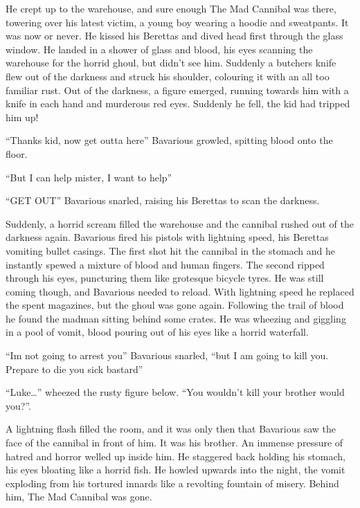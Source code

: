 He crept up to the warehouse, and sure enough The Mad Cannibal was
there, towering over his latest victim, a young boy wearing a
hoodie and sweatpants. It was now or never. He kissed his Berettas
and dived head first through the glass window. He landed in a
shower of glass and blood, his eyes scanning the warehouse for the
horrid ghoul, but didn't see him. Suddenly a butchers knife
flew out of the darkness and struck his shoulder, colouring it with
an all too familiar rust. Out of the darkness, a figure emerged,
running towards him with a knife in each hand and murderous red
eyes. Suddenly he fell, the kid had tripped him up!



``Thanks kid, now get outta here'' Bavarious growled,
spitting blood onto the floor.

``But I can help mister, I want to help''

``GET OUT'' Bavarious snarled, raising his Berettas to
scan the darkness.



Suddenly, a horrid scream filled the warehouse and the cannibal
rushed out of the darkness again. Bavarious fired his pistols with
lightning speed, his Berettas vomiting bullet casings. The first
shot hit the cannibal in the stomach and he instantly spewed a
mixture of blood and human fingers. The second ripped through his
eyes, puncturing them like grotesque bicycle tyres. He was still
coming though, and Bavarious needed to reload. With lightning speed
he replaced the spent magazines, but the ghoul was gone again.
Following the trail of blood he found the madman sitting behind
some crates. He was wheezing and giggling in a pool of vomit, blood
pouring out of his eyes like a horrid waterfall.



``Im not going to arrest you'' Bavarious snarled,
``but I am going to kill you. Prepare to die you sick
bastard''



``Luke{\ldots}'' wheezed the rusty figure below.
``You wouldn't kill your brother would
you?''.



A lightning flash filled the room, and it was only then that
Bavarious saw the face of the cannibal in front of him. It was his
brother. An immense pressure of hatred and horror welled up inside
him. He staggered back holding his stomach, his eyes bloating like
a horrid fish. He howled upwards into the night, the vomit
exploding from his tortured innards like a revolting fountain of
misery. Behind him, The Mad Cannibal was gone.






